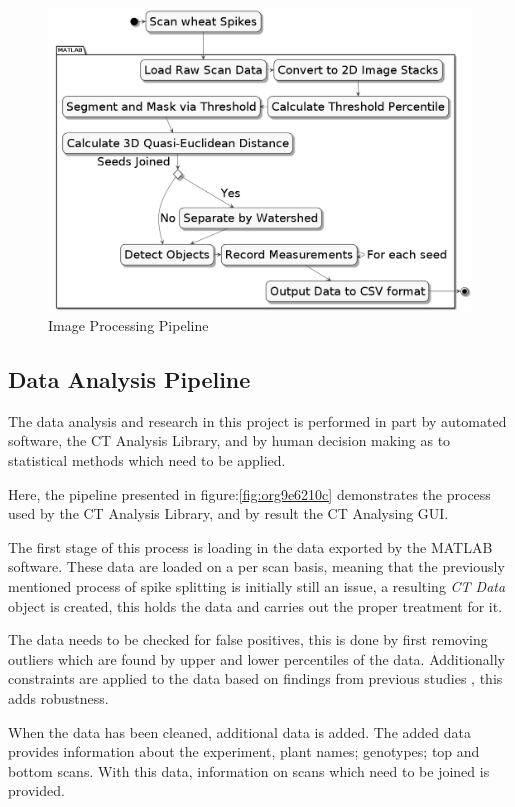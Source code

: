 \documentclass[11pt]{report}
\begin{document}
\begin{figure}[htbp]
\centering
\includegraphics[width=15cm]{./images/matlab.png}
\caption{\label{fig:org414546b}
Image Processing Pipeline}
\end{figure}

\subsection{Data Analysis Pipeline}
\label{sec:orga60b366}
The data analysis and research in this project is performed in part by automated software, the CT Analysis Library, and by human decision making as to statistical methods which need to be applied.

Here, the pipeline presented in figure:\ref{fig:org9e6210c} demonstrates the process used by the CT Analysis Library, and by result the CT Analysing GUI.

The first stage of this process is loading in the data exported by the MATLAB software. These data are loaded on a per scan basis, meaning that the previously mentioned process of spike splitting is initially still an issue, a resulting \emph{CT Data} object is created, this holds the data and carries out the proper treatment for it.

The data needs to be checked for false positives, this is done by first removing outliers which are found by upper and lower percentiles of the data. Additionally constraints are applied to the data based on findings from previous studies \cite{Hughes2017}, this adds robustness.

When the data has been cleaned, additional data is added. The added data provides information about the experiment, plant names; genotypes; top and bottom scans. With this data, information on scans which need to be joined is provided.
\end{document}
